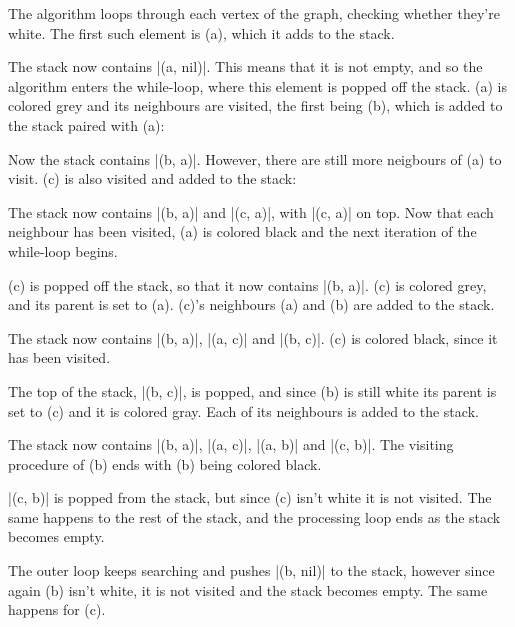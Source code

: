 \documentclass[a4paper]{article}
\begin{document}

The algorithm loops through each vertex of the graph, checking whether they're white. The first such element is (a), which it adds to the stack.

The stack now contains \code|(a, nil)|. This means that it is not empty, and so the algorithm enters the while-loop, where this element is popped off the stack. (a) is colored grey and its neighbours are visited, the first being (b), which is added to the stack paired with (a):


Now the stack contains \code|(b, a)|. However, there are still more neigbours of (a) to visit. (c) is also visited and added to the stack:

The stack now contains \code|(b, a)| and \code|(c, a)|, with \code|(c, a)| on top. Now that each neighbour has been visited, (a) is colored black and the next iteration of the while-loop begins.


(c) is popped off the stack, so that it now contains \code|(b, a)|. (c) is colored grey, and its parent is set to (a). (c)'s neighbours (a) and (b) are added to the stack.


The stack now contains \code|(b, a)|, \code|(a, c)| and \code|(b, c)|. (c) is colored black, since it has been visited.


The top of the stack, \code|(b, c)|, is popped, and since (b) is still white its parent is set to (c) and it is colored gray. Each of its neighbours is added to the stack.


The stack now contains \code|(b, a)|, \code|(a, c)|, \code|(a, b)| and \code|(c, b)|. The visiting procedure of (b) ends with (b) being colored black.


\code|(c, b)| is popped from the stack, but since (c) isn't white it is not visited. The same happens to the rest of the stack, and the processing loop ends as the stack becomes empty.

The outer loop keeps searching and pushes \code|(b, nil)| to the stack, however since again (b) isn't white, it is not visited and the stack becomes empty. The same happens for (c).
\end{document}
